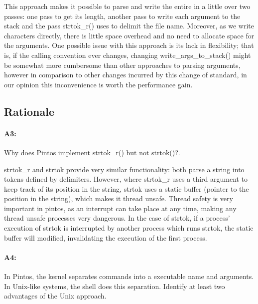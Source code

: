 This approach makes it possible to parse and write the entire in a little over two passes: one pass to get its length, another pass to write each argument to the stack and the pass strtok\_r() uses to delimit the file name.
Moreover, as we write characters directly, there is little space overhead and no need to allocate space for the arguments.
One possible issue with this approach is its lack in flexibility; that is, if the calling convention ever changes, changing write\_args\_to\_stack() might be somewhat more cumbersome than other approaches to parsing arguments, however in comparison to other changes incurred by this change of standard, in our opinion this inconvenience is worth the performance gain.

\subsection{Rationale}
\paragraph{A3:} %
Why does Pintos implement strtok\_r() but not strtok()?.

strtok\_r and strtok provide very similar functionality: both parse a string into tokens defined by delimiters.
However, where strtok\_r uses a third argument to keep track of its position in the string, strtok uses a static buffer (pointer to the position in the string), which makes it thread unsafe.
Thread safety is very important in pintos, as an interrupt can take place at any time, making any thread unsafe processes very dangerous. In the case of strtok, if a process' execution of strtok is interrupted by another process which runs strtok, the static buffer will modified, invalidating the execution of the first process.

\paragraph{A4:} %
In Pintos, the kernel separates commands into a executable name and arguments.  In Unix-like systems, the shell does this separation.  Identify at least two advantages of the Unix approach.
